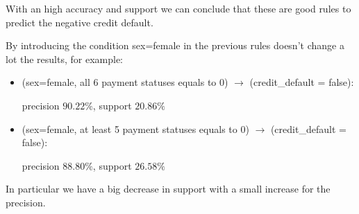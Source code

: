 With an high accuracy and support we can conclude that these are good rules to predict the negative credit default.

\smallskip

By introducing the condition sex=female in the previous rules doesn't change a lot the results, for example:

\begin{itemize}
  \item (sex=female, all 6 payment statuses equals to 0) $\rightarrow$ (credit\_default = false):
  
    \tab precision $90.22\%$, support $20.86\%$
  \item (sex=female, at least 5 payment statuses equals to 0) $\rightarrow$ (credit\_default = false):
  
    \tab precision $88.80\%$, support $26.58\%$
\end{itemize}

In particular we have a big decrease in support with a small increase for the precision.
